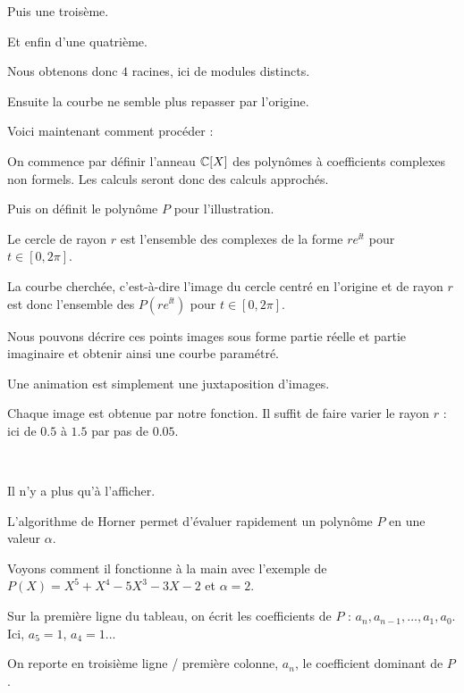 \change
Puis une troisème.

\change
Et enfin d'une quatrième.

Nous obtenons donc $4$ racines, ici de modules distincts.

\change
Ensuite la courbe ne semble plus repasser par l'origine.




\diapo

Voici maintenant comment procéder :


On commence par définir l'anneau $\mathbb{C}[X]$ des polynômes à coefficients complexes non formels.
  Les calculs seront donc des calculs approchés.%
  
  Puis on définit le polynôme $P$ pour l'illustration.
  
  
\change
  Le cercle de rayon $r$ est l'ensemble des complexes de la forme $re^{\ii t}$ pour $t\in [0,2\pi]$.

  La courbe cherchée, c'est-à-dire l'image du cercle centré en l'origine et de rayon $r$ est donc l'ensemble  des $P(re^{\ii t})$ pour $ t \in  [0,2\pi]$.
  
  Nous pouvons décrire ces points images sous forme partie réelle et partie imaginaire et obtenir ainsi une courbe paramétré.

Une animation est simplement une juxtaposition d'images. 

Chaque image est obtenue par notre fonction. Il suffit de faire varier le rayon $r$ : ici de $0.5$ à $1.5$ par pas de $0.05$.

~

Il n'y a plus qu'à l'afficher.


\diapo

L'algorithme de Horner permet d'évaluer rapidement un polynôme $P$ en une valeur $\alpha$.

\change
Voyons comment il fonctionne à la main avec l'exemple de $P(X) = X^5 + X^4 - 5X^3 - 3X - 2$
et $\alpha = 2$.


\change
Sur la première ligne du tableau, on écrit les coefficients de $P$ : $a_n,a_{n-1},\ldots,a_1,a_0$. Ici, $a_5=1$, $a_4=1$...

\change
On reporte en troisième ligne / première colonne, $a_n$, le coefficient dominant de $P$.

